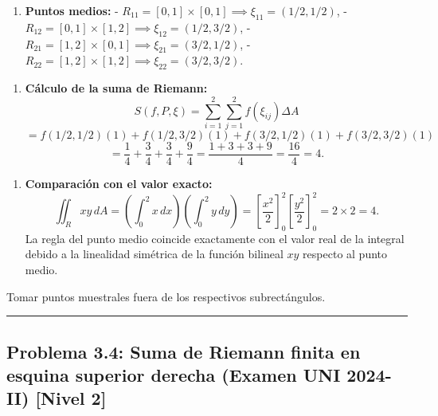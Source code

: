 \documentclass[11pt,a4paper]{article}
\begin{document}
\begin{enumerate}[label=\textbf{\arabic*.}]
\item \textbf{Puntos medios:}
- $R_{11} = [0,1]\times[0,1] \implies \xi_{11} = (1/2, 1/2)$,
- $R_{12} = [0,1]\times[1,2] \implies \xi_{12} = (1/2, 3/2)$,
- $R_{21} = [1,2]\times[0,1] \implies \xi_{21} = (3/2, 1/2)$,
- $R_{22} = [1,2]\times[1,2] \implies \xi_{22} = (3/2, 3/2)$.
\end{enumerate}

\begin{enumerate}[label=\textbf{\arabic*.}]
\item \textbf{Cálculo de la suma de Riemann:}
\begin{equation*}
S(f,P,\xi) = \sum_{i=1}^2 \sum_{j=1}^2 f(\xi_{ij}) \Delta A
\end{equation*}
\begin{equation*}
= f(1/2, 1/2)(1) + f(1/2, 3/2)(1) + f(3/2, 1/2)(1) + f(3/2, 3/2)(1)
\end{equation*}
\begin{equation*}
= \frac{1}{4} + \frac{3}{4} + \frac{3}{4} + \frac{9}{4} = \frac{1 + 3 + 3 + 9}{4} = \frac{16}{4} = 4.
\end{equation*}
\end{enumerate}

\begin{enumerate}[label=\textbf{\arabic*.}]
\item \textbf{Comparación con el valor exacto:}
\begin{equation*}
\iint_R xy \, dA = \left(\int_0^2 x \, dx\right) \left(\int_0^2 y \, dy\right) = \left[\frac{x^2}{2}\right]_0^2 \left[\frac{y^2}{2}\right]_0^2 = 2 \times 2 = 4.
\end{equation*}
La regla del punto medio coincide exactamente con el valor real de la integral debido a la linealidad simétrica de la función bilineal $xy$ respecto al punto medio.
\end{enumerate}

\begin{trapbox}
Tomar puntos muestrales fuera de los respectivos subrectángulos.
\end{trapbox}

\vspace{0.5cm}
\hrule
\vspace{0.5cm}

\subsection*{Problema 3.4: Suma de Riemann finita en esquina superior derecha (Examen UNI 2024-II) \hfill \color{primaryblue}\small[Nivel 2]}
\end{document}
